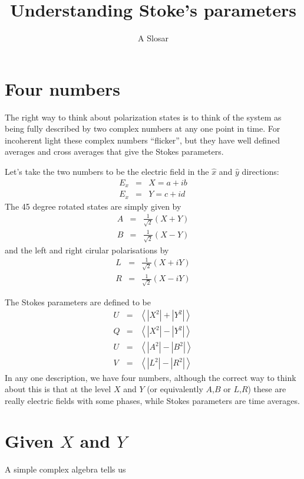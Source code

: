 \documentclass{article}
\begin{document}
\title{Understanding Stoke's parameters}
\author{A Slosar}
\maketitle
\section{Four numbers}

The right way to think about polarization states is to think of the
system as being fully described by two complex numbers at any one
point in time. For incoherent light these complex numbers ``flicker'',
but they have well defined averages and cross averages that give the
Stokes parameters.

Let's take the two numbers to be the electric field in the $\hat{x}$
and $\hat{y}$ directions:
\begin{eqnarray}
  E_x &=& X = a + ib \\
  E_x &=& Y = c + id 
\end{eqnarray}
The 45 degree rotated states are simply given by 
\begin{eqnarray}
  A &=& \frac{1}{\sqrt{2}} \left(X+Y\right)\\
  B &=& \frac{1}{\sqrt{2}} \left(X-Y\right)
\end{eqnarray}
and the left and right cirular polarisations by 
\begin{eqnarray}
  L &=& \frac{1}{\sqrt{2}} \left(X+iY\right)\\
  R &=& \frac{1}{\sqrt{2}} \left(X-iY\right)
\end{eqnarray}

The Stokes parameters are defined to be
\begin{eqnarray}
  U&=&\left<|X^2| + |Y^2| \right> \\
  Q&=&\left<|X^2| - |Y^2| \right> \\
  U&=&\left<|A^2| - |B^2| \right>\\
  V&=&\left<|L^2| - |R^2|\right> 
\end{eqnarray}
In any one description, we have four numbers, although the correct way
to think about this is that at the level $X$ and $Y$ (or equivalently
$A$,$B$ or $L$,$R$) these are really electric fields with some phases,
while Stokes parameters are time averages.

\section{Given $X$ and $Y$}
A simple complex algebra tells us
\end{document}
